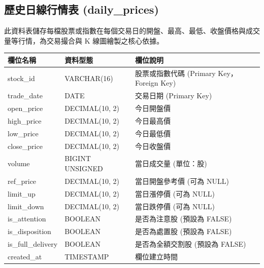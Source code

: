 \documentclass[UTF8, a4paper, 12pt, fontset=none]{ctexart}
\begin{document}
    \subsection{歷史日線行情表 (daily\_prices)}
    

    此資料表儲存每檔股票或指數在每個交易日的開盤、最高、最低、收盤價格與成交量等行情，為交易撮合與 K 線圖繪製之核心依據。

    \begin{center}
    \begin{tabular}{|l|l|p{8cm}|}
    \hline
    \textbf{欄位名稱} & \textbf{資料型態} & \textbf{欄位說明} \\ \hline
    stock\_id & VARCHAR(16) & 股票或指數代碼 (Primary Key，Foreign Key) \\ \hline
    trade\_date & DATE & 交易日期 (Primary Key) \\ \hline
    open\_price & DECIMAL(10, 2) & 今日開盤價 \\ \hline
    high\_price & DECIMAL(10, 2) & 今日最高價 \\ \hline
    low\_price & DECIMAL(10, 2) & 今日最低價 \\ \hline
    close\_price & DECIMAL(10, 2) & 今日收盤價 \\ \hline
    volume & BIGINT UNSIGNED & 當日成交量 (單位：股) \\ \hline
    ref\_price & DECIMAL(10, 2) & 當日開盤參考價 (可為 NULL) \\ \hline
    limit\_up & DECIMAL(10, 2) & 當日漲停價 (可為 NULL) \\ \hline
    limit\_down & DECIMAL(10, 2) & 當日跌停價 (可為 NULL) \\ \hline
    is\_attention & BOOLEAN & 是否為注意股 (預設為 FALSE) \\ \hline
    is\_disposition & BOOLEAN & 是否為處置股 (預設為 FALSE) \\ \hline
    is\_full\_delivery & BOOLEAN & 是否為全額交割股 (預設為 FALSE) \\ \hline
    created\_at & TIMESTAMP & 欄位建立時間 \\ \hline
    \end{tabular}
    \end{center}
\end{document}

